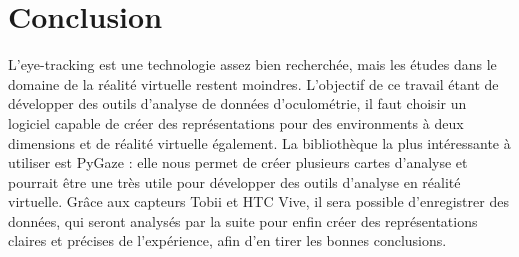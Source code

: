 \documentclass[12pt]{article}
\begin{document}

\pagebreak

\section{Conclusion}

L'eye-tracking est une technologie assez bien recherchée, mais les études dans
le domaine de la réalité virtuelle restent moindres. L'objectif de ce travail
étant de développer des outils d'analyse de données d'oculométrie, il faut
choisir un logiciel capable de créer des représentations pour des environments
à deux dimensions et de réalité virtuelle également. La bibliothèque la plus
intéressante à utiliser est PyGaze : elle nous permet de créer plusieurs cartes
d'analyse et pourrait être une très utile pour développer des outils d'analyse
en réalité virtuelle. Grâce aux capteurs Tobii et HTC Vive, il sera possible
d'enregistrer des données, qui seront analysés par la suite pour enfin créer des
représentations claires et précises de l'expérience, afin d'en tirer les bonnes
conclusions.


\pagebreak


\end{document}
